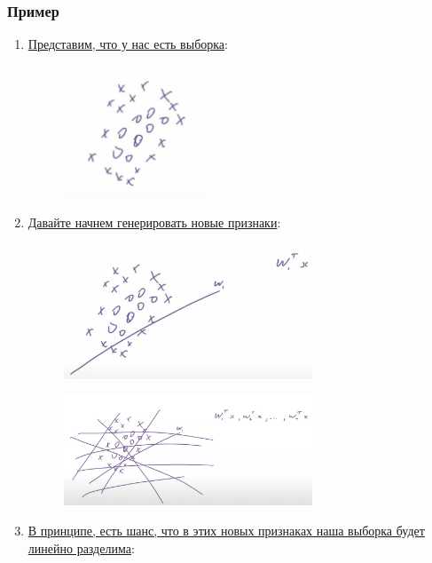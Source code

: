     \subsubsection{Пример}

        \begin{enumerate}
            \item \underline{Представим, что у нас есть выборка}:
        
                \begin{figure}[H]
                    \centering
                    \includegraphics[width=0.4\textwidth]{images/17lecture/random_kitchen_sinks_example1.png}
                \end{figure}


            \item \underline{Давайте начнем генерировать новые признаки}:

            \begin{figure}[H]
                \centering
                \includegraphics[width=0.7\textwidth]{images/17lecture/random_kitchen_sinks_example2.png}
            \end{figure}

            \begin{figure}[H]
                \centering
                \includegraphics[width=0.7\textwidth]{images/17lecture/random_kitchen_sinks_example3.png}
            \end{figure}

            \item \underline{В принципе, есть шанс, что в этих новых признаках наша выборка будет линейно разделима}:
        \end{enumerate}


